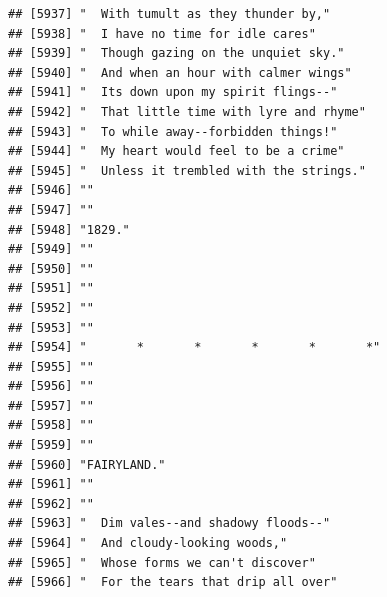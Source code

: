 \documentclass{article}\usepackage[]{graphicx}\usepackage[]{color}
\makeatletter
\newenvironment{kframe}{%
 \def\at@end@of@kframe{}%
 \ifinner\ifhmode%
  \def\at@end@of@kframe{\end{minipage}}%
  \begin{minipage}{\columnwidth}%
 \fi\fi%
 \def\FrameCommand##1{\hskip\@totalleftmargin \hskip-\fboxsep
 \colorbox{shadecolor}{##1}\hskip-\fboxsep
     \hskip-\linewidth \hskip-\@totalleftmargin \hskip\columnwidth}%
 \MakeFramed {\advance\hsize-\width
   \@totalleftmargin\z@ \linewidth\hsize
   \@setminipage}}%
 {\par\unskip\endMakeFramed%
 \at@end@of@kframe}
\newenvironment{knitrout}{}{} %
\makeatother
\begin{document}
\begin{knitrout}
\begin{kframe}
\begin{verbatim}
## [5937] "  With tumult as they thunder by,"                                           
## [5938] "  I have no time for idle cares"                                             
## [5939] "  Though gazing on the unquiet sky."                                         
## [5940] "  And when an hour with calmer wings"                                        
## [5941] "  Its down upon my spirit flings--"                                          
## [5942] "  That little time with lyre and rhyme"                                      
## [5943] "  To while away--forbidden things!"                                          
## [5944] "  My heart would feel to be a crime"                                         
## [5945] "  Unless it trembled with the strings."                                      
## [5946] ""                                                                            
## [5947] ""                                                                            
## [5948] "1829."                                                                       
## [5949] ""                                                                            
## [5950] ""                                                                            
## [5951] ""                                                                            
## [5952] ""                                                                            
## [5953] ""                                                                            
## [5954] "       *       *       *       *       *"                                    
## [5955] ""                                                                            
## [5956] ""                                                                            
## [5957] ""                                                                            
## [5958] ""                                                                            
## [5959] ""                                                                            
## [5960] "FAIRYLAND."                                                                  
## [5961] ""                                                                            
## [5962] ""                                                                            
## [5963] "  Dim vales--and shadowy floods--"                                           
## [5964] "  And cloudy-looking woods,"                                                 
## [5965] "  Whose forms we can't discover"                                             
## [5966] "  For the tears that drip all over"                                          

\end{verbatim}
\end{kframe}
\end{knitrout}
\end{document}
